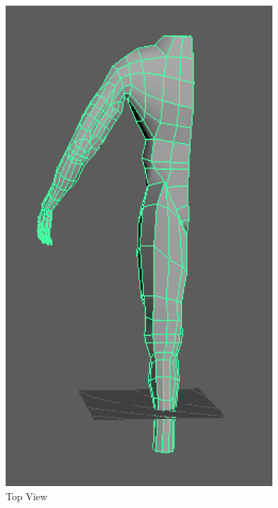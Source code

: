 \documentclass[a4paper]{article}
\begin{document}
\begin{figure}[h]
\centering
\includegraphics[width=10cm]{img/back.png}
\caption{Top View}
\label{fig:Angle View}
\end{figure}
\end{document}

